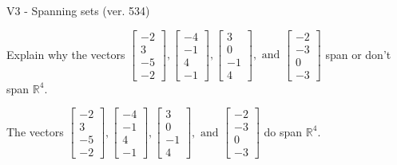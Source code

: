 \begin{exercise}
  \begin{exerciseTitle}V3 - Spanning sets (ver. 534)\end{exerciseTitle}
  \begin{exerciseStatement}
    Explain why the vectors \(\left[\begin{array}{r}
-2 \\
3 \\
-5 \\
-2
\end{array}\right] , \left[\begin{array}{r}
-4 \\
-1 \\
4 \\
-1
\end{array}\right] , \left[\begin{array}{r}
3 \\
0 \\
-1 \\
4
\end{array}\right] , \text{ and } \left[\begin{array}{r}
-2 \\
-3 \\
0 \\
-3
\end{array}\right]\) span or don't span \(\mathbb{R}^4\). 
	


  \end{exerciseStatement}
  \begin{exerciseAnswer}
   The vectors \(\left[\begin{array}{r}
-2 \\
3 \\
-5 \\
-2
\end{array}\right] , \left[\begin{array}{r}
-4 \\
-1 \\
4 \\
-1
\end{array}\right] , \left[\begin{array}{r}
3 \\
0 \\
-1 \\
4
\end{array}\right] , \text{ and } \left[\begin{array}{r}
-2 \\
-3 \\
0 \\
-3
\end{array}\right]\) 
  	 do  
	span \(\mathbb{R}^4\).
  


  \end{exerciseAnswer}
\end{exercise}